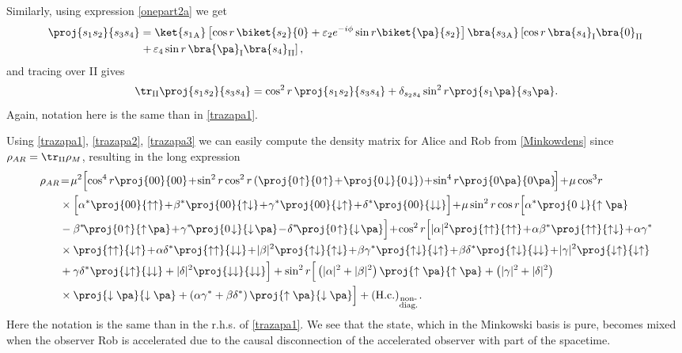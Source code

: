 Similarly, using expression \eqref{onepart2a} we get
\begin{align}
\nonumber\proj{s_1s_2}{s_3s_4}&=\ket{{s_{1}}_\text{A}}\left[\cos r\,\biket{s_2}{0}+\varepsilon_2e^{-i\phi}\sin r\biket{\pa}{s_2}\right]\bra{{s_{3}}_\text{A}}\left[\cos r\,{\bra{s_4}_\text{I}}{\bra{0}_\text{II}}\right.\\*
&\left.+\,\varepsilon_4\sin r\,{\bra{\pa}_\text{I}}{\bra{s_4}_\text{II}}\right],
\end{align}
and tracing over II gives
\begin{equation}\label{trazapa3}
\tr_\text{II}\proj{s_1s_2}{s_3s_4}=\cos^2 r\,\proj{s_1s_2}{s_3s_4}+\delta_{s_2s_4}\sin^2r\proj{s_1\pa}{s_3\pa}.\\*
\end{equation}
Again, notation here is the same than in \eqref{trazapa1}.

 Using \eqref{trazapa1}, \eqref{trazapa2}, \eqref{trazapa3} we can easily compute the density matrix for Alice and Rob from \eqref{Minkowdens} since $\rho_{AR}=\tr_\text{II}\rho_M$, resulting in the long expression
\begin{align}\label{generaldensmat}
\nonumber\rho_{AR}&\!=\!\mu^2\Big[\!\cos^4r\proj{00}{00}\!+\!\sin^2r\cos^2r\left(\proj{0\!\uparrow}{0\!\uparrow}\!+\!\proj{0\!\downarrow}{0\!\downarrow}\right)\!+\!\sin^4r\proj{0\pa}{0\pa}\!\Big]\!+\!\mu\cos^3\!r\\*
\nonumber&\times\Big[\alpha^*\proj{00}{\uparrow\uparrow}\!+\!\beta^*\proj{00}{\uparrow\downarrow}\!+\!\gamma^*\proj{00}{\downarrow\uparrow}\!+\!\delta^*\proj{00}{\downarrow\downarrow}\Big]\!+\!\mu\sin^2r\cos r\Big[\alpha^*\proj{0\downarrow}{\uparrow\pa}\\*
\nonumber&-\beta^*\!\proj{0\!\uparrow}{\uparrow\!\pa}\!+\!\gamma^*\!\proj{0\!\downarrow}{\downarrow\!\pa}\!-\!\delta^*\!\proj{0\!\uparrow}{\downarrow\!\pa}\Big]\!+\!\cos^2 r\Big[|\alpha|^2\proj{\uparrow\uparrow}{\uparrow\uparrow}\!+\!\alpha\beta^*\proj{\uparrow\uparrow}{\uparrow\downarrow}\!+\!\alpha\gamma^*\\*
\nonumber&\times\proj{\uparrow\uparrow}{\downarrow\uparrow}\!+\!\alpha\delta^*\proj{\uparrow\uparrow}{\downarrow\downarrow}\!+\!|\beta|^2\proj{\uparrow\downarrow}{\uparrow\downarrow}\!+\!\beta\gamma^*\proj{\uparrow\downarrow}{\downarrow\uparrow}\!+\!\beta\delta^*\proj{\uparrow\downarrow}{\downarrow\downarrow}\!+\!|\gamma|^2\proj{\downarrow\uparrow}{\downarrow\uparrow}\\*
\nonumber&+\gamma\delta^*\proj{\downarrow\uparrow}{\downarrow\downarrow}+|\delta|^2\proj{\downarrow\downarrow}{\downarrow\downarrow}\Big]+\sin^2r\Big[\left(|\alpha|^2+|\beta|^2\right)\proj{\uparrow\pa}{\uparrow\pa}+\left(|\gamma|^2+|\delta|^2\right)\\*
&\times\proj{\downarrow\pa}{\downarrow\pa}+\left(\alpha\gamma^*+\beta\delta^*\right)\proj{\uparrow\pa}{\downarrow\pa}\Big]+(\text{H.c.})_{_{\substack{\text{non-}\\\text{diag.}}}}.
\end{align}
Here the notation is the same than in the r.h.s. of \eqref{trazapa1}. We see that the state, which in the Minkowski basis is pure, becomes mixed when the observer Rob is accelerated due to the causal disconnection of the accelerated observer with part of the spacetime.



